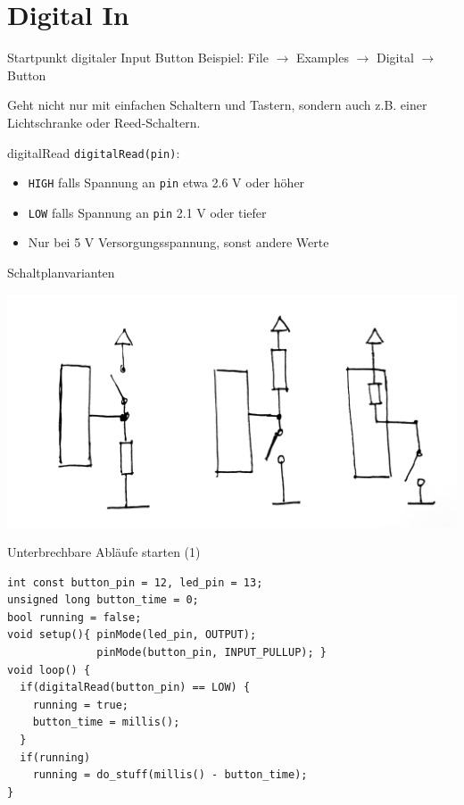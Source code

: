 \documentclass[bigger]{beamer}
\begin{document}
\section{Digital In}
\label{sec:org23f9698}
\begin{frame}[label={sec:orga360475}]{Startpunkt digitaler Input}
Button Beispiel: File \(\rightarrow\) Examples \(\rightarrow\) Digital
\(\rightarrow\) Button

Geht nicht nur mit einfachen Schaltern und Tastern, sondern auch
z.B. einer Lichtschranke oder Reed-Schaltern.
\end{frame}

\begin{frame}[fragile,label={sec:org7a5a384}]{digitalRead}
 \texttt{digitalRead(pin)}: 
\begin{itemize}
\item \texttt{HIGH} falls Spannung an \texttt{pin} etwa 2.6 V oder höher
\item \texttt{LOW} falls Spannung an \texttt{pin} 2.1 V oder tiefer
\item Nur bei 5 V Versorgungsspannung, sonst andere Werte
\end{itemize}
\end{frame}

\begin{frame}[label={sec:org9c55561}]{Schaltplanvarianten}
\begin{center}
\includegraphics[width=.9\linewidth]{./img/pullup.jpg}
\end{center}
\end{frame}

\begin{frame}[fragile,label={sec:org363ac09}]{Unterbrechbare Abläufe starten (1)}
 \begin{verbatim}
int const button_pin = 12, led_pin = 13;
unsigned long button_time = 0;
bool running = false;
void setup(){ pinMode(led_pin, OUTPUT);
              pinMode(button_pin, INPUT_PULLUP); }
void loop() {
  if(digitalRead(button_pin) == LOW) {
    running = true;
    button_time = millis();
  }
  if(running)
    running = do_stuff(millis() - button_time);
}
\end{verbatim}
\end{frame}
\end{document}
